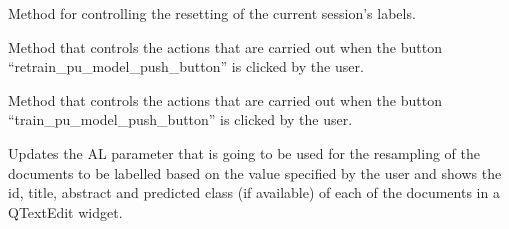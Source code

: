 \documentclass[letterpaper,10pt,english]{sphinxmanual}
\begin{document}
\begin{fulllineitems}
\begin{fulllineitems}
\label{\detokenize{gui_main_window:src.graphical_user_interface.main_window.MainWindow.clicked_reset_labels}}
\sphinxAtStartPar
Method for controlling the resetting of the current session’s labels.

\end{fulllineitems}


\begin{fulllineitems}
\label{\detokenize{gui_main_window:src.graphical_user_interface.main_window.MainWindow.clicked_retrain_model}}
\sphinxAtStartPar
Method that controls the actions that are carried out when the button “retrain\_pu\_model\_push\_button” is
clicked by the user.

\end{fulllineitems}


\begin{fulllineitems}
\label{\detokenize{gui_main_window:src.graphical_user_interface.main_window.MainWindow.clicked_train_PU_model}}
\sphinxAtStartPar
Method that controls the actions that are carried out when the button “train\_pu\_model\_push\_button” is
clicked by the user.

\end{fulllineitems}


\begin{fulllineitems}
\label{\detokenize{gui_main_window:src.graphical_user_interface.main_window.MainWindow.clicked_update_ndocs_al}}
\sphinxAtStartPar
Updates the AL parameter that is going to be used for the resampling of the documents to be labelled based
on the value specified by the user and shows the id, title, abstract and predicted class (if available) of each
of the documents in a QTextEdit widget.


\end{fulllineitems}
\end{fulllineitems}
\end{document}
